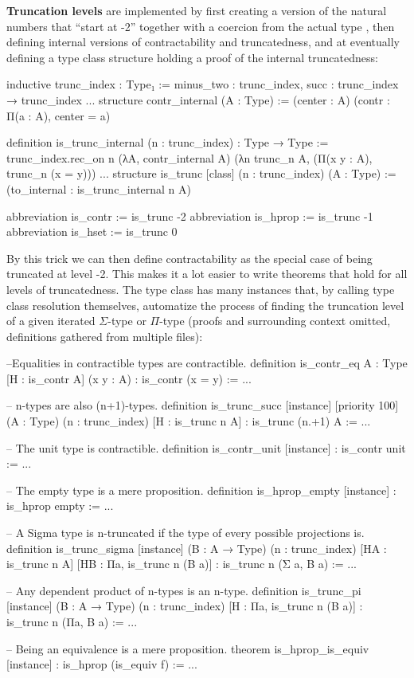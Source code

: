 \textbf{Truncation levels} are implemented by first creating a version of the natural
numbers that ``start at -2'' together with a coercion from the actual type
, then defining internal versions of contractability and truncatedness,
and at eventually defining a type class structure holding a proof of the internal
truncatedness:
\begin{leancodebr}
inductive trunc_index : Type₁ :=
  minus_two : trunc_index,
  succ : trunc_index → trunc_index
...
structure contr_internal (A : Type) :=
  (center : A)
  (contr : Π(a : A), center = a)

definition is_trunc_internal (n : trunc_index) : Type → Type :=
trunc_index.rec_on n (λA, contr_internal A)
  (λn trunc_n A, (Π(x y : A), trunc_n (x = y)))
...
structure is_trunc [class] (n : trunc_index) (A : Type) :=
  (to_internal : is_trunc_internal n A)

abbreviation is_contr := is_trunc -2
abbreviation is_hprop := is_trunc -1
abbreviation is_hset  := is_trunc 0
\end{leancodebr}
By this trick we can then define contractability as the special case of being 
truncated at level -2.
This makes it a lot easier to write theorems that hold for all levels of
truncatedness.
The type class  has many instances that, by calling type class
resolution themselves, automatize the process of finding the truncation level
of a given iterated $\Sigma$-type or $\Pi$-type (proofs and surrounding
context omitted, definitions gathered from multiple files):
\begin{leancodebr}
--Equalities in contractible types are contractible.
definition is_contr_eq {A : Type} [H : is_contr A] (x y : A) :
  is_contr (x = y) := ...

-- n-types are also (n+1)-types.
definition is_trunc_succ [instance] [priority 100] 
  (A : Type) (n : trunc_index) [H : is_trunc n A] : is_trunc (n.+1) A := ...

-- The unit type is contractible.
definition is_contr_unit [instance] : is_contr unit := ...

-- The empty type is a mere proposition.
definition is_hprop_empty [instance] : is_hprop empty := ...

-- A Sigma type is n-truncated if the type of every possible projections is.
definition is_trunc_sigma [instance] (B : A → Type) (n : trunc_index)
  [HA : is_trunc n A] [HB : Πa, is_trunc n (B a)] :
  is_trunc n (Σ a, B a) := ...
  
-- Any dependent product of n-types is an n-type.
definition is_trunc_pi [instance] (B : A → Type) (n : trunc_index)
  [H : Πa, is_trunc n (B a)] : is_trunc n (Πa, B a) := ...
  
-- Being an equivalence is a mere proposition.
theorem is_hprop_is_equiv [instance] : is_hprop (is_equiv f) := ...
\end{leancodebr}

